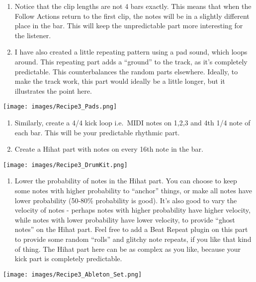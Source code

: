 \documentclass[
  12pt,
  letterpaper,
  oneside,
  open=any]{scrbook}
\providecommand{\tightlist}{%
  \setlength{\itemsep}{0pt}\setlength{\parskip}{0pt}}\usepackage{longtable,booktabs,array}
\begin{document}
\begin{enumerate}
\def\labelenumi{\arabic{enumi}.}
\setcounter{enumi}{3}
\item
  Notice that the clip lengths are not 4 bars exactly. This means that
  when the Follow Actions return to the first clip, the notes will be in
  a slightly different place in the bar. This will keep the
  unpredictable part more interesting for the listener.
\item
  I have also created a little repeating pattern using a pad sound,
  which loops around. This repeating part adds a ``ground'' to the
  track, as it's completely predictable. This counterbalances the random
  parts elsewhere. Ideally, to make the track work, this part would
  ideally be a little longer, but it illustrates the point here.
\end{enumerate}

\texttt{[image: images/Recipe3\_Pads.png]}

\begin{enumerate}
\def\labelenumi{\arabic{enumi}.}
\setcounter{enumi}{5}
\item
  Similarly, create a 4/4 kick loop i.e.~MIDI notes on 1,2,3 and 4th 1/4
  note of each bar. This will be your predictable rhythmic part.
\item
  Create a Hihat part with notes on every 16th note in the bar.
\end{enumerate}

\texttt{[image: images/Recipe3\_DrumKit.png]}

\begin{enumerate}
\def\labelenumi{\arabic{enumi}.}
\setcounter{enumi}{7}
\tightlist
\item
  Lower the probability of notes in the Hihat part. You can choose to
  keep some notes with higher probability to ``anchor'' things, or make
  all notes have lower probability (50-80\% probability is good). It's
  also good to vary the velocity of notes - perhaps notes with higher
  probability have higher velocity, while notes with lower probability
  have lower velocity, to provide ``ghost notes'' on the Hihat part.
  Feel free to add a Beat Repeat plugin on this part to provide some
  random ``rolls'' and glitchy note repeats, if you like that kind of
  thing. The Hihat part here can be as complex as you like, because your
  kick part is completely predictable.
\end{enumerate}

\texttt{[image: images/Recipe3\_Ableton\_Set.png]}
\end{document}
